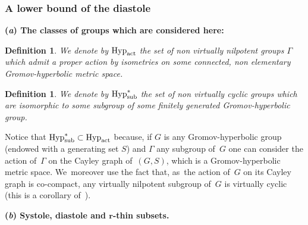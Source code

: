 \documentclass[10pt,a4paper]{amsart}
\numberwithin{equation}{section}
\newtheorem{defi}[theor]{Definition}
\begin{document}
\subsubsection{A lower bound of the diastole}\label{diastolebound}

{\bf (\emph{a}) The classes of groups which are considered here:}
\begin{defi}%
We denote by $\text{\rm Hyp}_{\rm act}$ the set of non virtually nilpotent groups $\Gamma$ which admit
a proper action by isometries on some connected, non elementary Gromov-hyperbolic metric space.
\end{defi}

\begin{defi}%
We denote by $\text{\rm Hyp}_{\rm sub}^*$ the set of non virtually cyclic
groups which are isomorphic to some subgroup of some finitely
generated Gromov-hyperbolic group.
\end{defi}

Notice that $\text{\rm Hyp}_{\rm sub}^* \subset \text{\rm Hyp}_{\rm act}$
because, if $G$ is any Gromov-hyperbolic group (endowed with a generating
set
$S$) and $\Gamma$ any subgroup of~$G$ one can consider the action of~$\Gamma$ on the Cayley graph of~$(G,S)$, which is a Gromov-hyperbolic metric space. We~moreover use the fact that, as~the action of~$G$ on its Cayley graph is co-compact, any virtually nilpotent subgroup of~$G$ is virtually
cyclic (this is a corollary of~\cite[Section~8, Th\'eor\`eme 37, p.~157]{GH}).

\medskip\noindent
{\bf (\emph{b}) Systole, diastole and $\boldsymbol r$-thin subsets.}
\end{document}
